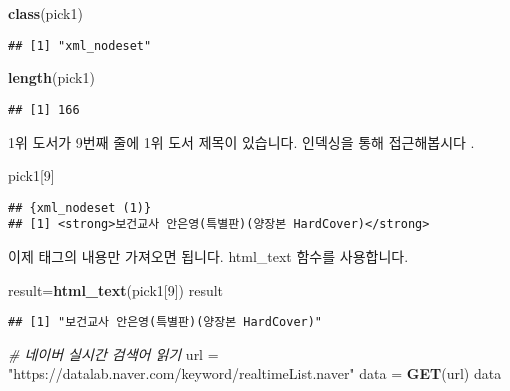 \documentclass[
]{article}
\newenvironment{Shaded}{\begin{snugshade}}{\end{snugshade}}
\newcommand{\CommentTok}[1]{\textcolor[rgb]{0.56,0.35,0.01}{\textit{#1}}}
\newcommand{\DecValTok}[1]{\textcolor[rgb]{0.00,0.00,0.81}{#1}}
\newcommand{\KeywordTok}[1]{\textcolor[rgb]{0.13,0.29,0.53}{\textbf{#1}}}
\newcommand{\NormalTok}[1]{#1}
\newcommand{\StringTok}[1]{\textcolor[rgb]{0.31,0.60,0.02}{#1}}
\begin{document}
\begin{Shaded}
\begin{Highlighting}[]
\KeywordTok{class}\NormalTok{(pick1)}
\end{Highlighting}
\end{Shaded}

\begin{verbatim}
## [1] "xml_nodeset"
\end{verbatim}

\begin{Shaded}
\begin{Highlighting}[]
\KeywordTok{length}\NormalTok{(pick1)}
\end{Highlighting}
\end{Shaded}

\begin{verbatim}
## [1] 166
\end{verbatim}

1위 도서가 9번째 줄에 1위 도서 제목이 있습니다. 인덱싱을 통해
접근해봅시다 .

\begin{Shaded}
\begin{Highlighting}[]
\NormalTok{pick1[}\DecValTok{9}\NormalTok{]}
\end{Highlighting}
\end{Shaded}

\begin{verbatim}
## {xml_nodeset (1)}
## [1] <strong>보건교사 안은영(특별판)(양장본 HardCover)</strong>
\end{verbatim}

이제 태그의 내용만 가져오면 됩니다. html\_text 함수를 사용합니다.

\begin{Shaded}
\begin{Highlighting}[]
\NormalTok{result=}\KeywordTok{html_text}\NormalTok{(pick1[}\DecValTok{9}\NormalTok{])}
\NormalTok{result}
\end{Highlighting}
\end{Shaded}

\begin{verbatim}
## [1] "보건교사 안은영(특별판)(양장본 HardCover)"
\end{verbatim}

\begin{Shaded}
\begin{Highlighting}[]
\CommentTok{# 네이버 실시간 검색어 읽기}
\NormalTok{url =}\StringTok{ "https://datalab.naver.com/keyword/realtimeList.naver"}
\NormalTok{data =}\StringTok{ }\KeywordTok{GET}\NormalTok{(url)}
\NormalTok{data}
\end{Highlighting}
\end{Shaded}
\end{document}
